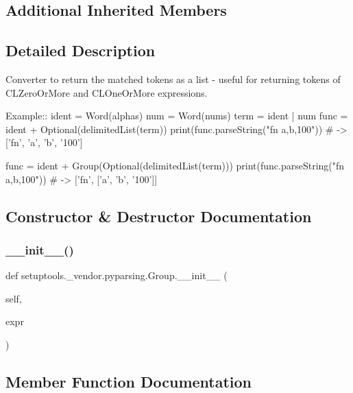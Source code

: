 \subsection*{Additional Inherited Members}


\subsection{Detailed Description}
\begin{DoxyVerb}Converter to return the matched tokens as a list - useful for returning tokens of C{L{ZeroOrMore}} and C{L{OneOrMore}} expressions.

Example::
    ident = Word(alphas)
    num = Word(nums)
    term = ident | num
    func = ident + Optional(delimitedList(term))
    print(func.parseString("fn a,b,100"))  # -> ['fn', 'a', 'b', '100']

    func = ident + Group(Optional(delimitedList(term)))
    print(func.parseString("fn a,b,100"))  # -> ['fn', ['a', 'b', '100']]
\end{DoxyVerb}
 

\subsection{Constructor \& Destructor Documentation}
\mbox{\label{classsetuptools_1_1__vendor_1_1pyparsing_1_1Group_ac8ddd6ac40275611871ddf1ce6eaa6da}} 
\subsubsection{\texorpdfstring{\+\_\+\+\_\+init\+\_\+\+\_\+()}{\_\_init\_\_()}}
{\footnotesize\ttfamily def setuptools.\+\_\+vendor.\+pyparsing.\+Group.\+\_\+\+\_\+init\+\_\+\+\_\+ (\begin{DoxyParamCaption}\item[{}]{self,  }\item[{}]{expr }\end{DoxyParamCaption})}



\subsection{Member Function Documentation}
\mbox{\label{classsetuptools_1_1__vendor_1_1pyparsing_1_1Group_a83c4ae0d82479b6fcac000adab3a3bc3}} 
